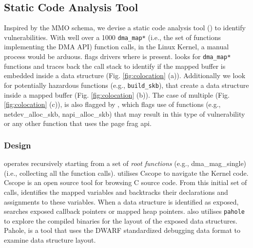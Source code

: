\subsection{Static Code Analysis Tool}\label{sec:static-analysis}

Inspired by the MMO schema, we devise a static code analysis tool (\tool) to identify \subpage vulnerabilities. With well over a 1000 \texttt{dma\_map*} (i.e., the set of functions implementing the DMA API) function calls, in the Linux Kernel, a manual process would be arduous. \tool flags drivers where \means{} is present. \tool looks for \texttt{dma\_map*} functions and traces back the call stack to identify if the mapped buffer is embedded inside a data structure (Fig. \ref{fig:colocation} (a)). Additionally we look for potentially hazardous functions (e.g., \texttt{build\_skb}), that create a data structure inside a mapped buffer (Fig. \ref{fig:colocation} (b)). 
The case of multiple \iova{} (Fig. \ref{fig:colocation} (c)), is also flagged by \tool, which flags use of functions (e.g., netdev\_alloc\_skb, napi\_alloc\_skb) that may result in this type of vulnerability or any other function that uses the page frag api. 




\subsubsection{Design}
\tool operates recursively starting from a set of \textit{root functions} (e.g., dma\_mag\_single) (i.e., collecting all the function calls). \tool utilises Cscope \cite{cscope,cscope_92} to navigate the Kernel code. Cscope is an open source tool for browsing C source code. From this initial set of calls, \tool identifies the mapped variables and backtracks their declarations and assignments to these variables. When a data structure is identified as exposed, \tool searches
exposed callback pointers or mapped heap pointers. \tool also utilises \texttt{pahole} \cite{dwarves} to explore the compiled binaries for the layout of the exposed data structures. Pahole, is a tool that uses the DWARF \cite{dwarf} standardized debugging data format to examine data structure layout.

